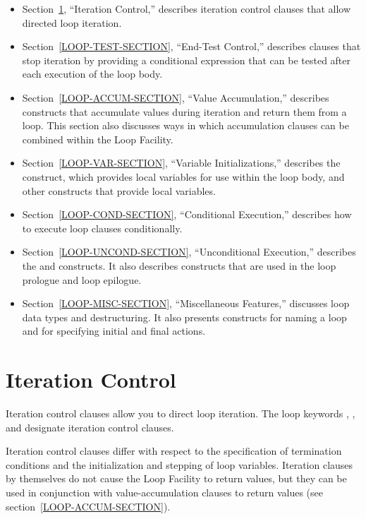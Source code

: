 \begin{itemize}

\item Section~\ref{LOOP-ITERATION-SECTION},
``Iteration Control,'' describes iteration
control clauses that allow directed loop iteration.  

\item Section~\ref{LOOP-TEST-SECTION}, ``End-Test Control,'' 
describes clauses that stop iteration by providing a conditional expression
that can be tested after each execution of the loop body.  

\item Section~\ref{LOOP-ACCUM-SECTION},
``Value Accumulation,'' describes constructs
that accumulate values during iteration and return them from a loop.  This section also
discusses ways in which accumulation clauses can be combined within the
Loop Facility.  

\item Section~\ref{LOOP-VAR-SECTION},
``Variable Initializations,'' describes the  
construct, which provides local variables for use within the loop
body, and other constructs that provide local variables.

\item Section~\ref{LOOP-COND-SECTION},
``Conditional Execution,'' describes how to execute loop
clauses conditionally.

\item Section~\ref{LOOP-UNCOND-SECTION},
``Unconditional Execution,'' describes the 
and  constructs.  It also describes constructs that are
used in the loop prologue and loop epilogue.

\item Section~\ref{LOOP-MISC-SECTION},
``Miscellaneous Features,'' discusses loop data types
and destructuring.  It also presents constructs for naming a loop and
for specifying initial and final actions.
\end{itemize}


\section{Iteration Control}
\label{LOOP-ITERATION-SECTION}

Iteration control clauses allow you to direct loop iteration.  The
loop keywords , , and  designate iteration control clauses.

Iteration control clauses differ with respect to the specification of
termination conditions and the initialization and stepping
of loop variables.  Iteration clauses by themselves
do not cause the Loop Facility to return values, but they
can be used in conjunction with value-accumulation clauses to
return values (see section~\ref{LOOP-ACCUM-SECTION}).

